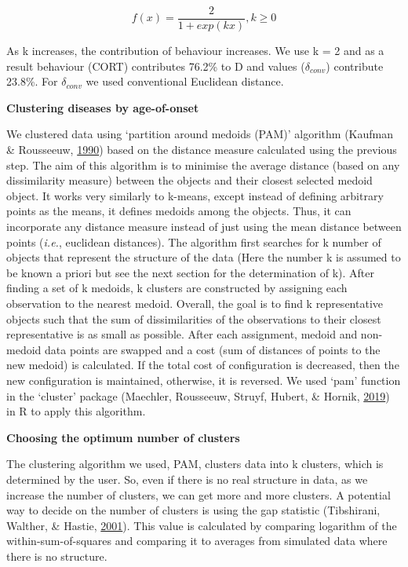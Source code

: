 \documentclass[12pt,twoside]{unicam}
\begin{document}
\begin{equation}
    f(x) = \dfrac{2}{1+exp(kx)}, k≥0
  \label{eq:disexpadaptivetuning}
\end{equation}

As k increases, the contribution of behaviour increases. We use k = 2 and as a result behaviour (CORT) contributes 76.2\% to D and values (\(\delta_{conv}\)) contribute 23.8\%. For \(\delta_{conv}\) we used conventional Euclidean distance.

\textbf{Clustering diseases by age-of-onset}

We clustered data using `partition around medoids (PAM)' algorithm (Kaufman \& Rousseeuw, \protect\hyperlink{ref-Kaufman1990}{1990}) based on the distance measure calculated using the previous step. The aim of this algorithm is to minimise the average distance (based on any dissimilarity measure) between the objects and their closest selected medoid object. It works very similarly to k-means, except instead of defining arbitrary points as the means, it defines medoids among the objects. Thus, it can incorporate any distance measure instead of just using the mean distance between points (\emph{i.e.}, euclidean distances). The algorithm first searches for k number of objects that represent the structure of the data (Here the number k is assumed to be known a priori but see the next section for the determination of k). After finding a set of k medoids, k clusters are constructed by assigning each observation to the nearest medoid. Overall, the goal is to find k representative objects such that the sum of dissimilarities of the observations to their closest representative is as small as possible. After each assignment, medoid and non-medoid data points are swapped and a cost (sum of distances of points to the new medoid) is calculated. If the total cost of configuration is decreased, then the new configuration is maintained, otherwise, it is reversed. We used `pam' function in the `cluster' package (Maechler, Rousseeuw, Struyf, Hubert, \& Hornik, \protect\hyperlink{ref-Maechler2019}{2019}) in R to apply this algorithm.

\textbf{Choosing the optimum number of clusters}

The clustering algorithm we used, PAM, clusters data into k clusters, which is determined by the user. So, even if there is no real structure in data, as we increase the number of clusters, we can get more and more clusters. A potential way to decide on the number of clusters is using the gap statistic (Tibshirani, Walther, \& Hastie, \protect\hyperlink{ref-Tibshirani2001}{2001}). This value is calculated by comparing logarithm of the within-sum-of-squares and comparing it to averages from simulated data where there is no structure.
\end{document}
